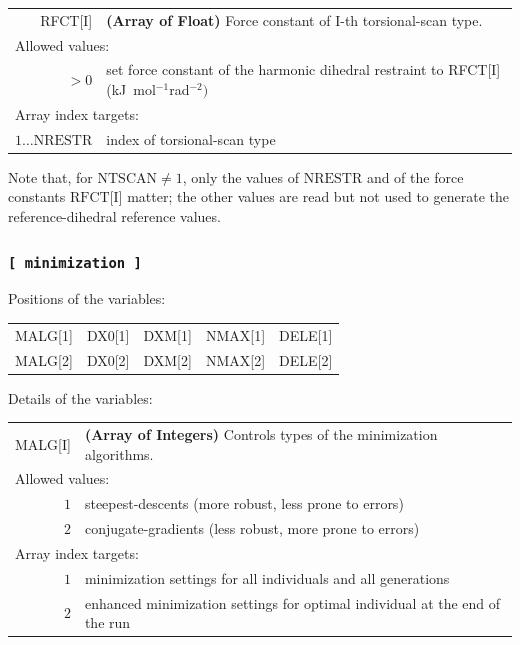 \documentclass[10pt,a4paper,openany]{memoir}
\numberwithin{equation}{section}
\begin{document}
{
\begin{tabular}{r@{ : }l}
\label{descr:rfct}
      RFCT[I]&\textbf{(Array of Float)} Force constant of I-th torsional-scan type.                                      \\ 
\multicolumn{2}{l}{Allowed values:} \\ 
    \(>0\)&set force constant of the harmonic dihedral restraint to RFCT[I] (kJ~mol$^{-1}$rad$^{-2})$        \\ 
\multicolumn{2}{l}{Array index targets:} \\ 
\(1 \ldots \text{NRESTR} \)&index of torsional-scan type                                                                      \\ 
\end{tabular}
\vspace{1ex}
}

Note that, for $\text{NTSCAN} \neq 1$, only the values of
$\text{NRESTR}$ and of the force constants $\text{RFCT[I]}$ matter;
the other values are read but not used to generate the
reference-dihedral reference values.

\subsubsection{\texttt{[~minimization~]}}
\label{sec:inp-minimization}


\noindent Positions of the variables:
\begin{center}
  \begin{tabular}{lllll}
    MALG[1] & DX0[1] & DXM[1] & NMAX[1] & DELE[1] \\
    MALG[2] & DX0[2] & DXM[2] & NMAX[2] & DELE[2] \\
  \end{tabular}
\end{center}

\noindent Details of the variables:
\vspace{2ex}

{
\begin{tabular}{r@{ : }l}
\label{descr:malg}
      MALG[I]&\textbf{(Array of Integers)} Controls types of the minimization algorithms.                                                                             \\ 
\multicolumn{2}{l}{Allowed values:} \\ 
     \(1\)&steepest-descents (more robust, less prone to errors)                                                                                    \\ 
     \(2\)&conjugate-gradients (less robust, more prone to errors)                                                                                  \\ 
\multicolumn{2}{l}{Array index targets:} \\ 
     \(1\)&minimization settings for all individuals and all generations \\
     \(2\)&enhanced minimization settings for optimal individual at the end of the run \\
\end{tabular}
\vspace{1ex}
}
\end{document}
